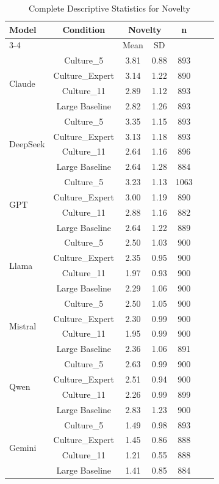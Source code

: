 \documentclass{article}
\begin{document}
\begin{table}[H]
\centering
\caption{Complete Descriptive Statistics for Novelty}
\label{tab:desc_novelty_full}
\begin{tabular}{lcccccc}
\toprule
\multirow{2}{*}{Model} & \multirow{2}{*}{Condition} & \multicolumn{2}{c}{Novelty} & \multirow{2}{*}{n} \\
\cmidrule(lr){3-4}
 & & Mean & SD & \\
\midrule
\multirow{4}{*}{Claude} & Culture\_5 & 3.81 & 0.88 & 893 \\
 & Culture\_Expert & 3.14 & 1.22 & 890 \\
 & Culture\_11 & 2.89 & 1.12 & 893 \\
 & Large Baseline & 2.82 & 1.26 & 893 \\
\midrule
\multirow{4}{*}{DeepSeek} & Culture\_5 & 3.35 & 1.15 & 893 \\
 & Culture\_Expert & 3.13 & 1.18 & 893 \\
 & Culture\_11 & 2.64 & 1.16 & 896 \\
 & Large Baseline & 2.64 & 1.28 & 884 \\
\midrule
\multirow{4}{*}{GPT} & Culture\_5 & 3.23 & 1.13 & 1063 \\
 & Culture\_Expert & 3.00 & 1.19 & 890 \\
 & Culture\_11 & 2.88 & 1.16 & 882 \\
 & Large Baseline & 2.64 & 1.22 & 889 \\
\midrule
\multirow{4}{*}{Llama} & Culture\_5 & 2.50 & 1.03 & 900 \\
 & Culture\_Expert & 2.35 & 0.95 & 900 \\
 & Culture\_11 & 1.97 & 0.93 & 900 \\
 & Large Baseline & 2.29 & 1.06 & 900 \\
\midrule
\multirow{4}{*}{Mistral} & Culture\_5 & 2.50 & 1.05 & 900 \\
 & Culture\_Expert & 2.30 & 0.99 & 900 \\
 & Culture\_11 & 1.95 & 0.99 & 900 \\
 & Large Baseline & 2.36 & 1.06 & 891 \\
\midrule
\multirow{4}{*}{Qwen} & Culture\_5 & 2.63 & 0.99 & 900 \\
 & Culture\_Expert & 2.51 & 0.94 & 900 \\
 & Culture\_11 & 2.26 & 0.99 & 899 \\
 & Large Baseline & 2.83 & 1.23 & 900 \\
\midrule
\multirow{4}{*}{Gemini} & Culture\_5 & 1.49 & 0.98 & 893 \\
 & Culture\_Expert & 1.45 & 0.86 & 888 \\
 & Culture\_11 & 1.21 & 0.55 & 888 \\
 & Large Baseline & 1.41 & 0.85 & 884 \\
\bottomrule
\end{tabular}
\end{table}
\end{document}
